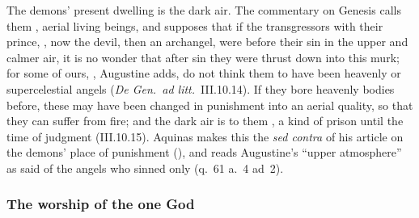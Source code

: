 The demons' present dwelling is the dark air. The commentary on Genesis
calls them , aerial living beings, and
supposes that if the transgressors with their prince, , now the devil, then an archangel, were before
their sin in the upper and calmer air, it is no wonder that after sin
they were thrust down into this murk; for some of ours, , Augustine adds, do not think them to have been heavenly or
supercelestial angels (\emph{De Gen.\ ad litt.}\ III.10.14). If they bore
heavenly bodies before, these may have been changed in punishment into an
aerial quality, so that they can suffer from fire; and the dark air is to
them , a kind of
prison until the time of judgment (III.10.15). Aquinas makes this the
\emph{sed contra} of his article on the demons' place of punishment
(), and reads Augustine's ``upper atmosphere'' as said
of the angels who sinned only (q.~61 a.~4 ad~2).

\subsubsection{The worship of the one God}\label{sec:aug-worship}

